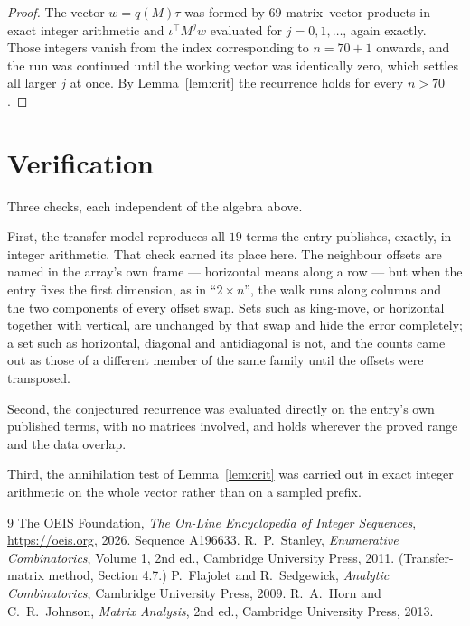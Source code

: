 \documentclass[11pt,a4paper]{article}
\theoremstyle{plain}
\theoremstyle{definition}
\begin{document}
\begin{proof}
The vector $w=q(M)\tau$ was formed by $69$ matrix--vector products in exact integer
arithmetic and $\iota^{\!\top}M^{j}w$ evaluated for $j=0,1,\dots$, again exactly. Those
integers vanish from the index corresponding to $n=70+1$ onwards, and the run was
continued until the working vector was identically zero, which settles all larger $j$ at once.
By Lemma~\ref{lem:crit} the recurrence holds for every $n>70$.
\end{proof}

\section{Verification}

Three checks, each independent of the algebra above.

First, the transfer model reproduces all $19$ terms the entry publishes, exactly, in
integer arithmetic. That check earned its place here. The neighbour offsets are named in the
array's own frame --- horizontal means along a row --- but when the entry fixes the first
dimension, as in ``$2\times n$'', the walk runs along columns and the two components of every
offset swap. Sets such as king-move, or horizontal together with vertical, are unchanged by
that swap and hide the error completely; a set such as horizontal, diagonal and antidiagonal
is not, and the counts came out as those of a different member of the same family until the
offsets were transposed.

Second, the conjectured recurrence was evaluated directly on the entry's own published terms,
with no matrices involved, and holds wherever the proved range and the data overlap.

Third, the annihilation test of Lemma~\ref{lem:crit} was carried out in exact integer
arithmetic on the whole vector rather than on a sampled prefix.

\begin{thebibliography}{9}
 The OEIS Foundation, \emph{The On-Line Encyclopedia of Integer
Sequences}, \url{https://oeis.org}, 2026. Sequence A196633.
 R.~P.~Stanley, \emph{Enumerative Combinatorics}, Volume 1, 2nd ed.,
Cambridge University Press, 2011. (Transfer-matrix method, Section 4.7.)
 P.~Flajolet and R.~Sedgewick, \emph{Analytic Combinatorics}, Cambridge
University Press, 2009.
 R.~A.~Horn and C.~R.~Johnson, \emph{Matrix Analysis}, 2nd ed., Cambridge
University Press, 2013.
\end{thebibliography}
\end{document}
